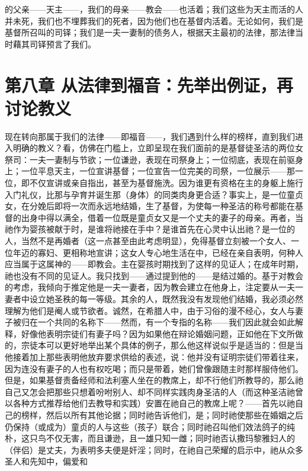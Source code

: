 的父亲——天主——，我们的母亲——教会——也活着；我们这些为天主而活的人并未死，我们也不埋葬我们的死者，因为他们也在基督内活着。无论如何，我们是基督所召叫的司铎；我们是一夫一妻制的债务人，根据天主最初的法律，那法律当时藉其司铎预言了我们。\par


\section{第八章 从法律到福音：先举出例证，再讨论教义}

现在转向那属于我们的法律——即福音——，我们遇到什么样的榜样，直到我们进入明确的教义？看，仿佛在门槛上，立即呈现在我们面前的是基督徒圣洁的两位女祭司：一夫一妻制与节欲；一位谦逊，表现在司祭身上；一位彻底，表现在前驱身上；一位平息天主，一位宣讲基督；一位宣告一位完美的司祭，一位展示——那一位，即不仅宣讲或亲自指出，甚至为基督施洗。因为谁更有资格在主的身躯上施行入门礼仪，比那与孕育并诞生那（身体）的同类肉身更合适？事实上，是一位童贞女，在分娩后即将一次而永远地结婚，生了基督，为使每一种圣洁的称号都能在基督的出身中得以满全，借着一位既是童贞女又是一个丈夫的妻子的母亲。再者，当祂作为婴孩被献于时，是谁将祂接在手中？是谁首先在心灵中认出祂？是一位的人，当然不是再婚者（这一点甚至由此考虑明显），免得基督立刻被一个女人、一位年迈的寡妇、更相称地宣讲；这女人专心地生活在中，已经在亲自表明，何种人应当属于这属神的——即教会。主在婴孩时期找到了这样的见证人；在成年时期，祂也没有不同的见证人。我只找到——通过提到他的——是结过婚的。基于对教会的考虑，我倾向于推定他是一夫一妻者，因为教会建立在他身上，注定要从一夫一妻者中设立她圣秩的每一等级。其余的人，既然我没有发现他们结婚，我必须必然理解为他们是阉人或节欲者。诚然，在希腊人中，由于习俗的漫不经心，女人与妻子被归在一个共同的名称下——然而，有一个专指的名称——我们因此就会如此解释，好像他表明宗徒们有妻子吗？因为如果他在辩论婚姻问题，正如他在下文所做的，宗徒本可以更好地举出某个具体的例子，那么他这样说似乎是适当的：但是当他接着加上那些表明他放弃要求供给的表述，说：他并没有证明宗徒们带着往来，因为连没有妻子的人也有权吃喝；而只是带着，她们曾像跟随主时那样服侍他们。但是，如果基督责备经师和法利塞人坐在的教席上，却不行他们所教导的，那么祂自己又怎会把那些只想着吩咐别人、却不同样实践肉身圣洁的人（而这种圣洁祂曾以各种方式推荐给他们去教导和实践）安置在祂自己的教席上呢？——首先以祂自己的榜样，然后以所有其他论据；同时祂告诉他们，是；同时祂使那些在婚姻之后仍保持（或成为）童贞的人与这些（孩子）联合；同时祂召叫他们效法鸽子的纯朴，这只鸟不仅无害，而且谦逊，且一雄只知一雌；同时祂否认撒玛黎雅妇人的（伴侣）是丈夫，为表明多夫便是奸淫；同时，在祂自己荣耀的启示中，祂从众多圣人和先知中，偏爱和\Person